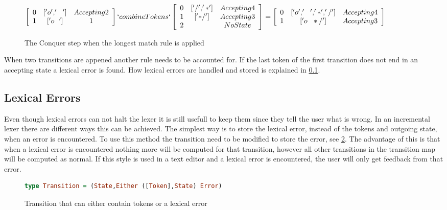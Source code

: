 \begin{figure}[!ht]
\begin{center}
$\left[\begin{array}{ccc}
0&['o','~~']& Accepting 2\\
1&['o~~'] & 1\\
\end{array}\right] `combineTokens` 
\left[\begin{array}{ccc}
0&['/','*']&Accepting 4\\
1&['*/']&Accepting 3\\
2& &NoState\\
\end{array}\right] =
\left[\begin{array}{ccc}
0&['o','~~','*','/']&Accepting 4\\
1&['o~~*/']& Accepting 3\\
\end{array}\right]$
\caption{The Conquer step when the longest match rule is applied\label{fig:longconq}}
\end{center}
\end{figure}

When two transitions are appened another rule needs to be accounted for. If the
last token of the first transition does not end in an accepting state a lexical
error is found. How lexical errors are handled and stored is explained in
\cref{sec:lexerr}.

\subsection{Lexical Errors}\label{sec:lexerr}
Even though lexical errors can not halt the lexer it is still usefull to keep
them since they tell the user what is wrong. In an incremental lexer there are
different ways this can be achieved. The simplest way is to store the lexical
error, instead of the tokens and outgoing state, when an error is encountered.
To use this method the transition need to be modified to store the error, see
\cref{fig:error1}. The advantage of this is that when a lexical error is
encountered nothing more will be computed for that transition, however all other
transitions in the transition map will be computed as normal. If this style is
used in a text editor and a lexical error is encountered, the user will only get
feedback from that error.

\begin{figure}[!ht]
\begin{lstlisting}[language=Haskell]
type Transition = (State,Either ([Token],State) Error)
\end{lstlisting}
\caption{Transition that can either contain tokens or a lexical error\label{fig:error1}}
\end{figure}

